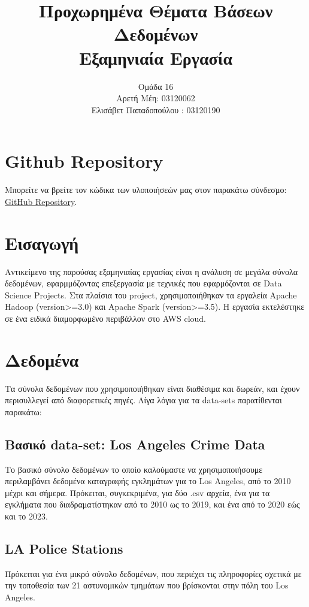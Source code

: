 \documentclass{article}
\begin{document}
\title{Προχωρημένα Θέματα Βάσεων Δεδομένων \\ Εξαμηνιαία Εργασία}
\date{}
\author{ 
\large Ομάδα 16 \\
Αρετή Μέη: 03120062 \\ 
Ελισάβετ Παπαδοπούλου : 03120190
}
\maketitle 
\pagebreak

\section*{ Github Repository } 
Μπορείτε να βρείτε τον κώδικα των υλοποιήσεών μας στον παρακάτω σύνδεσμο: \\
\href{https://github.com/ntua-el20062/Advanced_Databases.git}{GitHub Repository}.

\section{ Εισαγωγή }
Αντικείμενο της παρούσας εξαμηνιαίας εργασίας είναι η ανάλυση σε μεγάλα σύνολα δεδομένων, εφαρμμόζοντας επεξεργασία με τεχνικές που εφαρμόζονται σε Data Science Projects. Στα πλαίσια του project, χρησιμοποιήθηκαν τα εργαλεία Apache Hadoop (version>=3.0) και Apache Spark (version>=3.5). Η εργασία εκτελέστηκε σε ένα ειδικά διαμορφωμένο περιβάλλον στο AWS cloud. 

\section{ Δεδομένα }
Τα σύνολα δεδομένων που χρησιμοποιήθηκαν είναι διαθέσιμα και δωρεάν, και έχουν περισυλλεγεί από διαφορετικές πηγές. Λίγα λόγια για τα data-sets παρατίθενται παρακάτω: 

\subsection{ Βασικό data-set: Los Angeles Crime Data }
Το βασικό σύνολο δεδομένων το οποίο καλούμαστε να χρησιμοποιήσουμε περιλαμβάνει δεδομένα καταγραφής εγκλημάτων για το Los Angeles, από το 2010 μέχρι και σήμερα. Πρόκειται, συγκεκριμένα, για δύο .csv αρχεία, ένα για τα εγκλήματα που διαδραματίστηκαν από το 2010 ως το 2019, και ένα από το 2020 εώς και το 2023. 

\subsection{ LA Police Stations } 
Πρόκειται για ένα μικρό σύνολο δεδομένων, που περιέχει τις πληροφορίες σχετικά με την τοποθεσία των 21 αστυνομικών τμημάτων που βρίσκονται στην πόλη του Los Angeles. 
\end{document}
